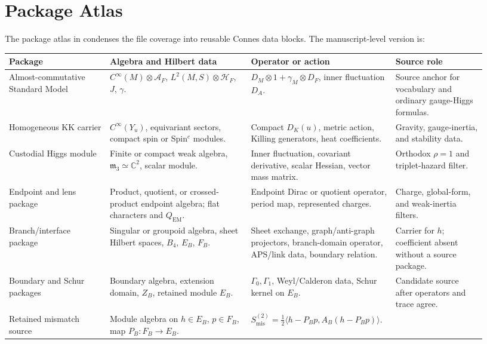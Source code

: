 \documentclass[11pt]{article}
\newcommand{\CC}{\mathbb{C}}
\newcommand{\AF}{\mathcal A_F}
\newcommand{\DF}{D_F}
\newcommand{\DA}{D_A}
\newcommand{\mthree}{\mathfrak m_3}
\begin{document}
\section{Package Atlas}

The package atlas in \cite{ncg-package-atlas} condenses the file coverage
into reusable Connes data blocks.  The manuscript-level version is:
\begin{center}
\small
\setlength{\tabcolsep}{3pt}
\begin{tabular}{@{}L{0.20\linewidth}L{0.28\linewidth}L{0.27\linewidth}L{0.18\linewidth}@{}}
\toprule
Package & Algebra and Hilbert data & Operator or action & Source role \\
\midrule
Almost-commutative Standard Model
  & \(C^\infty(M)\otimes\AF\), \(L^2(M,S)\otimes\mathcal H_F\),
    \(J\), \(\gamma\).
  & \(D_M\otimes1+\gamma_M\otimes\DF\), inner fluctuation \(\DA\).
  & Source anchor for vocabulary and ordinary gauge-Higgs formulas. \\
Homogeneous KK carrier
  & \(C^\infty(Y_u)\), equivariant sectors, compact spin or
    Spin\({}^c\) modules.
  & Compact \(D_K(u)\), metric action, Killing generators, heat
    coefficients.
  & Gravity, gauge-inertia, and stability data. \\
Custodial Higgs module
  & Finite or compact weak algebra, \(\mthree\simeq\CC^2\), scalar module.
  & Inner fluctuation, covariant derivative, scalar Hessian, vector mass
    matrix.
  & Orthodox \(\rho=1\) and triplet-hazard filter. \\
Endpoint and lens package
  & Product, quotient, or crossed-product endpoint algebra; flat
    characters and \(Q_{\mathrm{EM}}\).
  & Endpoint Dirac or quotient operator, period map, represented charges.
  & Charge, global-form, and weak-inertia filters. \\
Branch/interface package
  & Singular or groupoid algebra, sheet Hilbert spaces, \(B_4\), \(E_B\),
    \(F_B\).
  & Sheet exchange, graph/anti-graph projectors, branch-domain operator,
    APS/link data, boundary relation.
  & Carrier for \(h\); coefficient absent without a source package. \\
Boundary and Schur packages
  & Boundary algebra, extension domain, \(Z_B\), retained module \(E_B\).
  & \(\Gamma_0,\Gamma_1\), Weyl/Calderon data, Schur kernel on \(E_B\).
  & Candidate source after operators and trace agree. \\
Retained mismatch source
  & Module algebra on \(h\in E_B\), \(p\in F_B\), map \(P_B:F_B\to E_B\).
  & \(S_{\mathrm{mis}}^{(2)}=\frac12\langle h-P_Bp,A_B(h-P_Bp)\rangle\).

\end{tabular}
\end{center}
\end{document}
